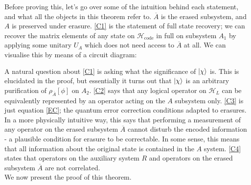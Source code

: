 \documentclass[12pt,a4paper]{report}
\numberwithin{equation}{section}
\newcommand{\Hcode}{\mathcal{H}_{\text{code}}}
\newcommand{\ol}[1]{\overline{#1}}
\theoremstyle{definition}
\theoremstyle{theorem}
\theoremstyle{theorem}
\theoremstyle{example}
\theoremstyle{definition}
\begin{document}
Before proving this, let's go over some of the intuition behind each statement, and what all the objects in this theorem refer to. $\ol{A}$ is the erased subsystem, and $A$ is preserved under erasure. \ref{C1} is the statement of full state recovery; we can recover the matrix elements of any state on $\Hcode$ in full on subsystem $A_{1}$ by applying some unitary $U_{A}$ which does not need access to $\ol{A}$ at all. We can visualise this by means of a circuit diagram:
\begin{figure}[H] 
	\centering
\end{figure}
A natural question about \ref{C1} is asking what the significance of $\ket{\chi}$ is. This is elucidated in the proof, but essentially it turns out that $\ket{\chi}$ is an arbitrary purification of $\rho_{\ol{A}}[\phi]$ on $A_{2}$. \ref{C2} says that any logical operator on $\mathcal{H}_{L}$ can be equivalently represented by an operator acting on the $A$ subsystem only. \ref{C3} is just equation \ref{EC}; the quantum error correction conditions adapted to erasures. In a more physically intuitive way, this says that performing a measurement of any operator on the erased subsystem $\ol{A}$ cannot disturb the encoded information - a plausible condition for erasure to be correctable. In some sense, this means that all information about the original state is contained in the $A$ system. \ref{C4} states that operators on the auxiliary system $R$ and operators on the erased subsystem $\ol{A}$ are not correlated.\\
We now present the proof of this theorem.
\newcommand{\Xabar}{X_{\overline{A}}}
\end{document}

